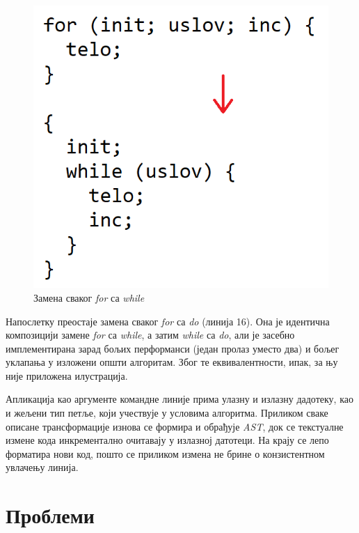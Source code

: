 \documentclass[a4paper]{article}
\begin{document}
\begin{figure}[h!]
\begin{center}
\includegraphics[scale=0.6]{for2while}
\end{center}
\caption{Замена сваког \textit{for} са \textit{while}}
\label{for2while}
\end{figure}

Напослетку преостаје замена сваког \textit{for} са \textit{do} (линија 16). Она је идентична композицији замене \textit{for} са \textit{while}, а затим \textit{while} са \textit{do}, али је засебно имплементирана зарад бољих перформанси (један пролаз уместо два) и бољег уклапања у изложени општи алгоритам. Због те еквивалентности, ипак, за њу није приложена илустрација.

Апликација као аргументе командне линије прима улазну и излазну дадотеку, као и жељени тип петље, који учествује у условима алгоритма. Приликом сваке описане трансформације изнова се формира и обрађује \textit{AST}, док се текстуалне измене кода инкрементално очитавају у излазној датотеци. На крају се лепо форматира нови код, пошто се приликом измена не брине о конзистентном увлачењу линија.

\section{Проблеми}
\end{document}
